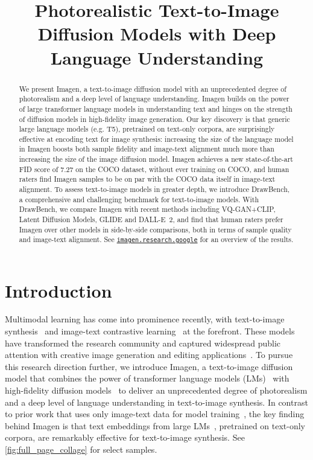 \title{Photorealistic Text-to-Image Diffusion Models with Deep Language Understanding}

\begin{abstract}
We present Imagen, a text-to-image diffusion model with an unprecedented degree of photorealism and a deep level of language understanding. Imagen builds on the power of large transformer language models in understanding text and hinges on the strength of diffusion models in high-fidelity image generation. Our key discovery is that generic large language models (e.g. T5), pretrained on text-only corpora, are surprisingly effective at encoding text for image synthesis: increasing the size of the language model in Imagen boosts both sample fidelity and image-text alignment much more than increasing the size of the image diffusion model. Imagen achieves a new state-of-the-art FID score of 7.27 on the COCO dataset, without ever training on COCO, and human raters find Imagen samples to be on par with the COCO data itself in image-text alignment. To assess text-to-image models in greater depth, we introduce DrawBench, a comprehensive and challenging benchmark for text-to-image models. With DrawBench, we compare Imagen with recent methods including VQ-GAN+CLIP, Latent Diffusion Models, GLIDE and DALL-E~2, and find that human raters prefer Imagen over other models in side-by-side comparisons, both in terms of sample quality and image-text alignment. See \href{https://imagen.research.google/}{\texttt{imagen.research.google}} for an overview of the results.
\end{abstract}

\section{Introduction}

Multimodal learning has come into prominence recently, with text-to-image synthesis~\cite{ramesh-dalle, crowson2022vqgan, rombach-cvpr-2022} and image-text contrastive learning~\cite{radford-icml-2021,jia2021scaling,weston2011wsabie} at the forefront. These models have transformed the research community and captured widespread public attention with creative image generation \cite{gafni2022make, ramesh-dalle2} and editing applications~\cite{fu2021language, nichol-glide, kim2021diffusionclip}. To pursue this research direction further, we introduce Imagen, a text-to-image diffusion model that combines the power of transformer language models (LMs)~\cite{devlin-naacl-2019,raffel-jmlr-2020} with high-fidelity diffusion models~\cite{ho2020denoising, ho2021cascaded, dhariwal2021diffusion, nichol-glide} to deliver an unprecedented degree of photorealism and a deep level of language understanding in text-to-image synthesis. In contrast to prior work that uses only image-text data for model training~\cite[e.g.,][]{ramesh-dalle, nichol-glide}, the key finding behind Imagen is that text embeddings from large LMs~\cite{raffel-jmlr-2020, devlin-naacl-2019}, pretrained on text-only corpora, are remarkably effective for text-to-image synthesis. See \ref{fig:full_page_collage} for select samples.

